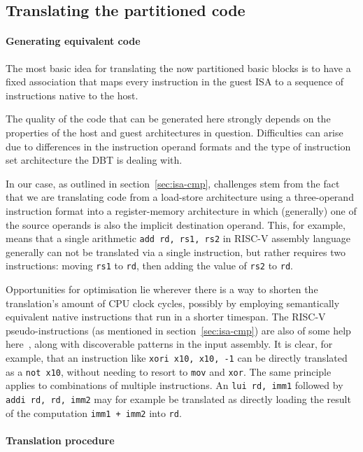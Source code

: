 \subsection{Translating the partitioned code}
\paragraph{Generating equivalent code}
The most basic idea for translating the now partitioned basic blocks is to have a fixed association that maps every instruction in the guest ISA to a sequence of instructions native to the host.

The quality of the code that can be generated here strongly depends on the properties of the host and guest architectures in question.
Difficulties can arise due to differences in the instruction operand formats and the type of instruction set architecture the DBT is dealing with.

In our case, as outlined in section~\ref{sec:isa-cmp}, challenges stem from the fact that we are translating code from a load-store architecture using a three-operand instruction format into a register-memory architecture in which (generally) one of the source operands is also the implicit destination operand.
This, for example, means that a single arithmetic \texttt{add rd, rs1, rs2} in RISC-V assembly language generally can not be translated via a single instruction, but rather requires two instructions: moving \texttt{rs1} to \texttt{rd}, then adding the value of \texttt{rs2} to \texttt{rd}.

Opportunities for optimisation lie wherever there is a way to shorten the translation's amount of CPU clock cycles, possibly by employing semantically equivalent native instructions that run in a shorter timespan.
The RISC-V pseudo-instructions (as mentioned in section~\ref{sec:isa-cmp}) are also of some help here~\cite[S. 139]{riscvspec}, along with discoverable patterns in the input assembly.
It is clear, for example, that an instruction like \texttt{xori~x10,~x10,~-1} can be directly translated as a \texttt{not x10}, without needing to resort to \texttt{mov} and \texttt{xor}.
The same principle applies to combinations of multiple instructions.
An \texttt{lui~rd,~imm1} followed by \texttt{addi~rd,~rd,~imm2} may for example be translated as directly loading the result of the computation \texttt{imm1~+~imm2} into \texttt{rd}.

\paragraph{Translation procedure}

